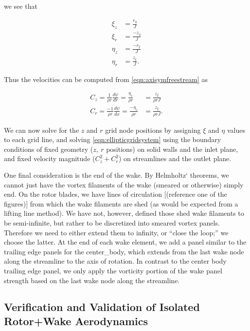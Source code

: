 \noindent we see that

\begin{align}
    \xi_z &= \frac{r_\eta}{J} \\
    \xi_r &= \frac{-z_\eta}{J} \\
    \eta_z &= \frac{-r_\xi}{J} \\
    \eta_r &= \frac{z_\xi}{J}.
\end{align}

\noindent Thus the velocities can be computed from \cref{eqn:axisymfreestream} as

\begin{align}
    C_z = \frac{1}{\rho r} \frac{d\psi}{dr} = \frac{\eta_r}{\rho r} &= \frac{z_\xi}{\rho r J} \\
    C_r = \frac{-1}{\rho r} \frac{d\psi}{dx} = \frac{-\eta_z}{\rho r} &= \frac{z_\xi}{\rho r J}.
\end{align}


We can now solve for the \(z\) and \(r\) grid node positions by assigning \(\xi\) and \(\eta\) values to each grid line, and solving \cref{eqn:ellipticgridsystem} using the boundary conditions of fixed geometry (\(z,~r\) positions) on solid walls and the inlet plane, and fixed velocity magnitude (\(C_z^2+C_r^2\)) on streamlines and the outlet plane.


One final consideration is the end of the wake.
%
By Helmholtz` theorems, we cannot just have the vortex filaments of the wake (smeared or otherwise) simply end.
%
On the rotor blades, we have lines of circulation [(reference one of the figures)] from which the wake filaments are shed (as would be expected from a lifting line method).
%
We have not, however, defined those shed wake filaments to be semi-infinite, but rather to be discretized into smeared vortex panels.
%
Therefore we need to either extend them to infinity, or ``close the loop;'' we choose the latter.
%
At the end of each wake element, we add a panel similar to the trailing edge panels for the center_body, which extends from the last wake node along the streamline to the axis of rotation.
%
In contrast to the center body trailing edge panel, we only apply the vorticity portion of the wake panel strength based on the last wake node along the streamline.


\subsection{Verification and Validation of Isolated Rotor+Wake Aerodynamics}
\label{ssec:rwvv}

